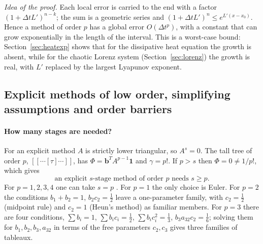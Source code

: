 \documentclass[11pt,a4paper]{article}
\newcommand{\Dt}{\Delta t}
\begin{document}
\emph{Idea of the proof.} Each local error is carried to the end with a factor $(1+\Dt L')^{n-k}$; the sum is a geometric series and $(1+\Dt L')^n\le e^{L'(x-x_0)}$.
Hence a method of order $p$ has a global error $O(\Dt^p)$, with a constant that can grow exponentially in the
length of the interval. This is a worst-case bound: Section~\ref{sec:heatexp} shows that for the dissipative heat
equation the growth is absent, while for the chaotic Lorenz system (Section~\ref{sec:lorenz}) the growth is
real, with $L'$ replaced by the largest Lyapunov exponent.

\subsection{Explicit methods of low order, simplifying assumptions and order barriers}\label{sec:simplify}

\paragraph{How many stages are needed?} For an explicit method $A$ is strictly lower triangular, so $A^s=0$.
The tall tree of order $p$, $[[\cdots[\tau]\cdots]]$, has $\Phi=\mathbf b^TA^{p-1}\mathbf1$ and $\gamma=p!$.
If $p>s$ then $\Phi=0\ne1/p!$, which gives \cite[Thm.~324A]{butcher2008}
\begin{equation}
\text{an explicit }s\text{-stage method of order }p\text{ needs }s\ge p.
\end{equation}
For $p=1,2,3,4$ one can take $s=p$ \cite[Sect.~320, 322]{butcher2008}.
For $p=1$ the only choice is Euler. For $p=2$ the conditions $b_1+b_2=1$, $b_2c_2=\tfrac12$ leave a
one-parameter family, with $c_2=\tfrac12$ (midpoint rule) and $c_2=1$ (Heun's method) as familiar members. For $p=3$ there
are four conditions, $\sum b_i=1$, $\sum b_ic_i=\tfrac12$, $\sum b_ic_i^2=\tfrac13$, $b_3a_{32}c_2=\tfrac16$; solving them for
$b_1,b_2,b_3,a_{32}$ in terms of the free parameters $c_2,c_3$ gives three families of tableaux.
\end{document}
